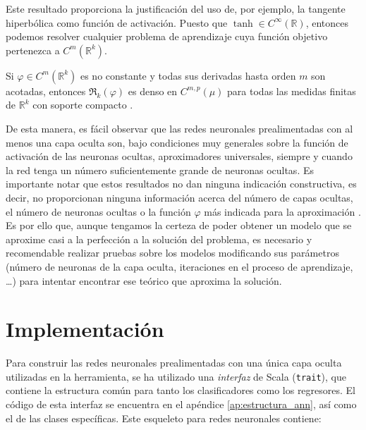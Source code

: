 Este resultado proporciona la justificación del uso de, por ejemplo, la tangente hiperbólica como función de activación.
Puesto que $\tanh\in C^\infty(\mathbb{R})$, entonces podemos resolver cualquier problema de aprendizaje cuya función
objetivo pertenezca a $C^m(\mathbb{R}^k)$.

\begin{teorema}Si $\varphi\in C^m(\mathbb{R}^k)$ es no constante y todas sus derivadas hasta orden $m$ son acotadas,
entonces $\mathfrak{R}_k(\varphi)$ es denso en $C^{m,p}(\mu)$ para todas las medidas finitas de $\mathbb{R}^k$ con 
soporte compacto \cite{hornik_1991}.
\end{teorema}

De esta manera, es fácil observar que las redes neuronales prealimentadas con al menos una capa oculta son, bajo 
condiciones muy generales sobre la función de activación de las neuronas ocultas, aproximadores universales, siempre y 
cuando la red tenga un número suficientemente grande de neuronas ocultas. Es importante notar que estos resultados no 
dan ninguna indicación constructiva, es decir, no proporcionan ninguna información acerca del número de capas ocultas, 
el número de neuronas ocultas o la función $\varphi$ más indicada para la aproximación \cite{hornik_1991}. Es por ello 
que, aunque tengamos la certeza de poder obtener un modelo que se aproxime casi a la perfección a la solución del 
problema, es necesario y recomendable realizar pruebas sobre los modelos modificando sus parámetros (número de neuronas 
de la capa oculta, iteraciones en el proceso de aprendizaje, \dots) para intentar encontrar ese teórico que aproxima la solución.

\section{Implementación}

Para construir las redes neuronales prealimentadas con una única capa oculta utilizadas en la herramienta, se ha 
utilizado una \textit{interfaz} de Scala (\texttt{trait}), que contiene la estructura común para tanto los 
clasificadores como los regresores. El código de esta interfaz se encuentra en el apéndice \ref{ap:estructura_ann},
así como el de las clases específicas. Este esqueleto para redes neuronales contiene:


